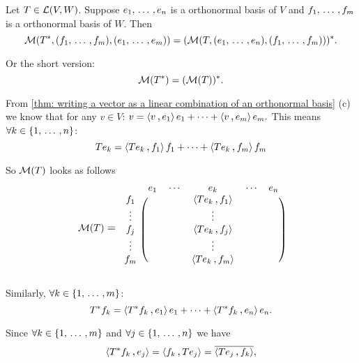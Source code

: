 \begin{thm}
  Let $T \in {\mathcal{L}(V,W)}$. Suppose $e_1, {\, \ldots \,\,}, e_n$ is a orthonormal basis of $V$ and $f_1, {\, \ldots \,\,}, f_m$ is a orthonormal basis of $W$. Then
  \[
    \mathcal{M}(T^*, (f_1, {\, \ldots \,\,}, f_m), (e_1, {\, \ldots \,\,}, e_m)) = ( \mathcal{M}(T, (e_1, {\, \ldots \,\,}, e_n), (f_1, {\, \ldots \,\,}, f_m)))^*.
  \]

  Or the short version:
  \[
     \mathcal{M}(T^*) = (\mathcal{M}(T))^*.
  \]
\end{thm}
\begin{prf}
  From \ref{thm: writing a vector as a linear combination of an orthonormal basis} (c) we know that for any $v\in V$: $v = \ip{v}{e_1}e_1 + \cdots + \ip{v}{e_m}e_m.$ This means $\forall k \in \{1, {\, \ldots \,\,}, n\}$:
  \[
    T e_k = \ip{T e_k}{f_1}f_1 + \cdots + \ip{T e_k}{f_m}f_m
  \]

  So $\mathcal{M}(T)$ looks as follows
  \[
    \mmatrix(T)
    \;\mathlarger{=}\;
    \begin{blockarray}{cccccc}
    & e_1 & \cdots &  e_k      & \cdots & e_n \\
    \begin{block}{c(ccccc)}
      f_1    &  &  & \ip{T e_k}{f_1} & & \\
      \vdots &  &  & \vdots          & & \\
      f_j    &  &  & \ip{T e_k}{f_j} & & \\
      \vdots &  &  & \vdots          & & \\
      f_m    &  &  & \ip{T e_k}{f_m} & & \\
    \end{block}
    \end{blockarray}
  \]

  Similarly, $\forall k \in \{1, {\, \ldots \,\,}, m \}$:
  \[
    T^* f_k = \ip{T^* f_k}{e_1}e_1 + \cdots + \ip{T^* f_k}{e_n}e_n.
  \]

  Since $\forall k \in \{1, {\, \ldots \,\,}, m\}$ and $\forall j \in \{1, {\, \ldots \,\,}, n\}$ we have
  \[
    \ip{T^* f_k}{e_j} = \ip{f_k}{T e_j} = \overline{\ip{T e_j}{f_k}},
  \]


\end{prf}
